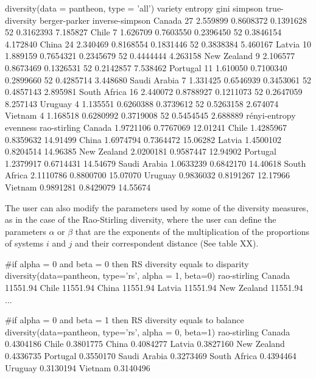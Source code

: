 \begin{example}
  diversity(data = pantheon, type = 'all')
    variety  entropy      gini   simpson true-diversity berger-parker inverse-simpson
Canada            27 2.559899 0.8608372 0.1391628             52     0.3162393        7.185827
Chile              7 1.626709 0.7603550 0.2396450             52     0.3846154        4.172840
China             24 2.340469 0.8168554 0.1831446             52     0.3838384        5.460167
Latvia            10 1.889159 0.7654321 0.2345679             52     0.4444444        4.263158
New Zealand        9 2.106577 0.8673469 0.1326531             52     0.2142857        7.538462
Portugal          11 1.610050 0.7100340 0.2899660             52     0.4285714        3.448680
Saudi Arabia       7 1.331425 0.6546939 0.3453061             52     0.4857143        2.895981
South Africa      16 2.440072 0.8788927 0.1211073             52     0.2647059        8.257143
Uruguay            4 1.135551 0.6260388 0.3739612             52     0.5263158        2.674074
Vietnam            4 1.168518 0.6280992 0.3719008             52     0.5454545        2.688889
             rényi-entropy  evenness rao-stirling
Canada           1.9721106 0.7767069     12.01241
Chile            1.4285967 0.8359632     14.91499
China            1.6974794 0.7364472     15.06282
Latvia           1.4500102 0.8204514     14.96385
New Zealand      2.0200181 0.9587447     12.94902
Portugal         1.2379917 0.6714431     14.54679
Saudi Arabia     1.0633239 0.6842170     14.40618
South Africa     2.1110786 0.8800700     15.07070
Uruguay          0.9836032 0.8191267     12.17966
Vietnam          0.9891281 0.8429079     14.55674
\end{example}

The user can also modify the parameters used by some of the diversity measures, as in the case of the Rao-Stirling diversity, where the user can define the parameters $\alpha$ or $\beta$ that are the exponents of the multiplication of the proportions of systems $i$ and $j$ and their correspondent distance (See table XX).

\begin{example}
  #if alpha = 0 and beta = 0 then RS diversity equals to disparity
  diversity(data=pantheon, type='rs', alpha = 1, beta=0)
               rao-stirling
Canada           11551.94
Chile            11551.94
China            11551.94
Latvia           11551.94
New Zealand      11551.94
...

  #if alpha = 0 and beta = 1 then RS diversity equals to balance
  diversity(data=pantheon, type='rs', alpha = 0, beta=1)
rao-stirling
Canada          0.4304186
Chile           0.3801775
China           0.4084277
Latvia          0.3827160
New Zealand     0.4336735
Portugal        0.3550170
Saudi Arabia    0.3273469
South Africa    0.4394464
Uruguay         0.3130194
Vietnam         0.3140496
\end{example}

